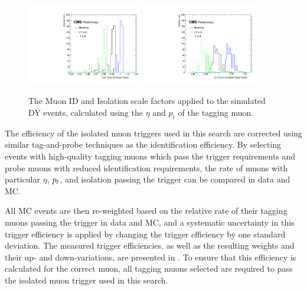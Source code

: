 \begin{figure}[htbp]
	\centering
	\includegraphics[width=0.45\textwidth]{figures/idSF.pdf}
        \hspace{0.01\textwidth}
        \includegraphics[width=0.45\textwidth]{figures/isoSF.pdf}
	\caption[Muon ID and Isolation Scale Factors]{The Muon ID and Isolation scale factors applied to the simulated DY events, calculated using the $\eta$ and $p_t$ of the tagging muon.}
        \label{fig:muIdIsoSFs}
\end{figure}

The efficiency of the isolated muon triggers used in this search are corrected using similar tag-and-probe techniques as the identification efficiency. 
By selecting events with high-quality tagging muons which pass the trigger requirements and probe muons with reduced identification requirements, the rate of muons with particular $\eta$, $p_t$, and isolation passing the trigger can be compared in data and MC.

All MC events are then re-weighted based on the relative rate of their tagging muons passing the trigger in data and MC, and a systematic uncertainty in this trigger efficiency is applied by changing the trigger efficiency by one standard deviation.
The measured trigger efficiencies, as well as the resulting weights and their up- and down-variations, are presented in .
To ensure that this efficiency is calculated for the correct muon, all tagging muons selected are required to pass the isolated muon trigger used in this search.


